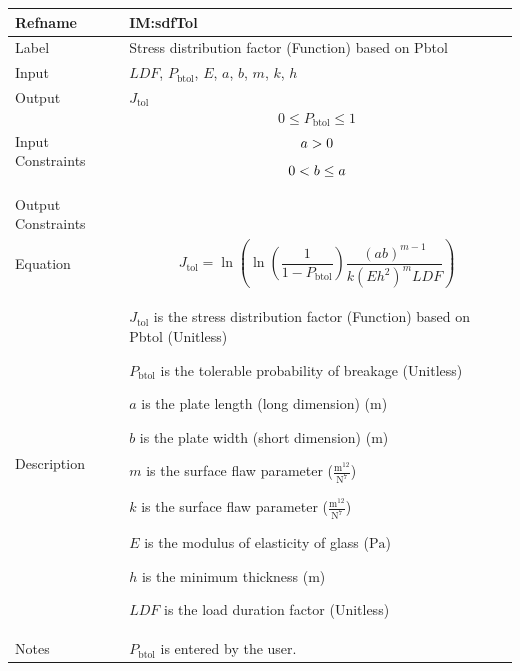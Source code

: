 \documentclass[12pt]{article}
\newcommand{\gt}{\ensuremath >}
\newcommand{\lt}{\ensuremath <}
\begin{document}
\medskip
\noindent
\begin{minipage}{\textwidth}
\begin{tabular}{>{\raggedright}p{}>{\raggedright\arraybackslash}p{}}
\toprule \textbf{Refname} & \textbf{IM:sdfTol}
\label{IM:sdfTol}
\\ \midrule
Label & Stress distribution factor (Function) based on Pbtol
        
\\ \midrule
Input & $\mathit{LDF}$, ${P_{\text{b}\text{tol}}}$, $E$, $a$, $b$, $m$, $k$, $h$
        
\\ \midrule
Output & ${J_{\text{tol}}}$
         
\\ \midrule
Input Constraints & \begin{displaymath}
                    0\leq{}{P_{\text{b}\text{tol}}}\leq{}1
                    \end{displaymath}
                    \begin{displaymath}
                    a\gt{}0
                    \end{displaymath}
                    \begin{displaymath}
                    0\lt{}b\leq{}a
                    \end{displaymath}
\\ \midrule
Output Constraints & 
\\ \midrule
Equation & \begin{displaymath}
           {J_{\text{tol}}}=\ln\left(\ln\left(\frac{1}{1-{P_{\text{b}\text{tol}}}}\right) \frac{\left(a b\right)^{m-1}}{k \left(E h^{2}\right)^{m} \mathit{LDF}}\right)
           \end{displaymath}
\\ \midrule
Description & \begin{symbDescription}
              \item{${J_{\text{tol}}}$ is the stress distribution factor (Function) based on Pbtol (Unitless)}
              \item{${P_{\text{b}\text{tol}}}$ is the tolerable probability of breakage (Unitless)}
              \item{$a$ is the plate length (long dimension) (${\text{m}}$)}
              \item{$b$ is the plate width (short dimension) (${\text{m}}$)}
              \item{$m$ is the surface flaw parameter ($\frac{\text{m}^{12}}{\text{N}^{7}}$)}
              \item{$k$ is the surface flaw parameter ($\frac{\text{m}^{12}}{\text{N}^{7}}$)}
              \item{$E$ is the modulus of elasticity of glass (${\text{Pa}}$)}
              \item{$h$ is the minimum thickness (${\text{m}}$)}
              \item{$\mathit{LDF}$ is the load duration factor (Unitless)}
              \end{symbDescription}
\\ \midrule
Notes & ${P_{\text{b}\text{tol}}}$ is entered by the user.
        

\end{tabular}
\end{minipage}
\end{document}
